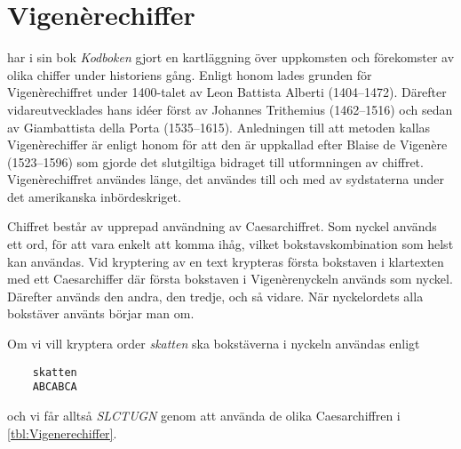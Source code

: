 \section{Vigenèrechiffer}
\citet{Singh2000tcb} har i sin bok \emph{Kodboken} gjort en kartläggning över 
uppkomsten och förekomster av olika chiffer under historiens gång.
Enligt honom lades grunden för Vigenèrechiffret under 1400-talet av Leon 
Battista Alberti (1404--1472).
Därefter vidareutvecklades hans idéer först av Johannes Trithemius (1462--1516) 
och sedan av Giambattista della Porta (1535--1615).
Anledningen till att metoden kallas Vigenèrechiffer är enligt honom för att den 
är uppkallad efter Blaise de Vigenère (1523--1596) som gjorde det slutgiltiga 
bidraget till utformningen av chiffret.
Vigenèrechiffret användes länge, det användes till och med av sydstaterna under 
det amerikanska inbördeskriget.

Chiffret består av upprepad användning av Caesarchiffret.
Som nyckel används ett ord, för att vara enkelt att komma ihåg, vilket 
bokstavskombination som helst kan användas.
Vid kryptering av en text krypteras första bokstaven i klartexten med ett 
Caesarchiffer där första bokstaven i Vigenèrenyckeln används som nyckel.
Därefter används den andra, den tredje, och så vidare.
När nyckelordets alla bokstäver använts börjar man om.

\begin{example}\label{ex:VigenereSkatten}
  Om vi vill kryptera order \emph{skatten} ska bokstäverna i nyckeln användas 
  enligt
  \begin{verbatim}
    skatten
    ABCABCA
  \end{verbatim}
  och vi får alltså \emph{SLCTUGN} genom att använda de olika Caesarchiffren 
  i \cref{tbl:Vigenerechiffer}.
\end{example}

